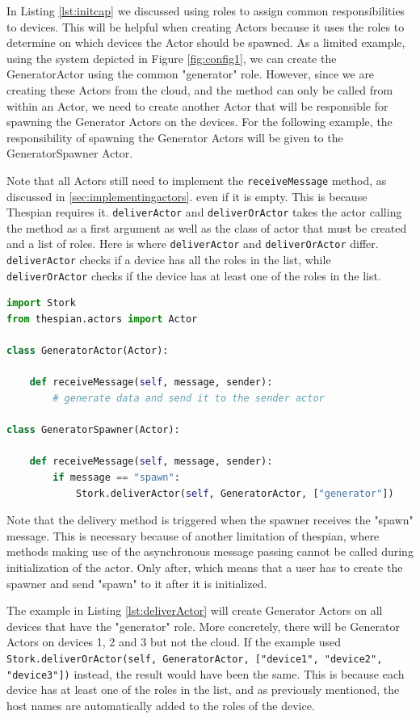 \documentclass[a4paper]{article}
\newcommand{\secref}[1]{\autoref{#1}.}
\begin{document}
In Listing \ref{lst:initcap} we discussed using roles to assign common responsibilities to devices. This will be helpful when creating Actors because it uses the roles to determine on which devices the Actor should be spawned. As a limited example, using the system depicted in Figure \ref{fig:config1}, we can create the GeneratorActor using the common "generator" role. However, since we are creating these Actors from the cloud, and the method can only be called from within an Actor, we need to create another Actor that will be responsible for spawning the Generator Actors on the devices. For the following example, the responsibility of spawning the Generator Actors will be given to the GeneratorSpawner Actor.

Note that all Actors still need to implement the \lstinline{receiveMessage} method, as discussed in \secref{sec:implementingactors} even if it is empty. This is because Thespian requires it. \lstinline|deliverActor| and \lstinline|deliverOrActor| takes the actor calling the method as a first argument as well as the class of actor that must be created and a list of roles. Here is where \lstinline|deliverActor| and \lstinline|deliverOrActor| differ. \lstinline|deliverActor| checks if a device has all the roles in the list, while \lstinline|deliverOrActor| checks if the device has at least one of the roles in the list.
\begin{lstlisting}[language=Python, caption=Delivering Actors, label=lst:deliverActor]
import Stork
from thespian.actors import Actor

class GeneratorActor(Actor):

    def receiveMessage(self, message, sender):
        # generate data and send it to the sender actor

class GeneratorSpawner(Actor):

    def receiveMessage(self, message, sender):
        if message == "spawn":
            Stork.deliverActor(self, GeneratorActor, ["generator"])

\end{lstlisting}
Note that the delivery method is triggered when the spawner receives the "spawn" message. This is necessary because of another limitation of thespian, where methods making use of the asynchronous message passing cannot be called during initialization of the actor. Only after, which means that a user has to create the spawner and send "spawn" to it after it is initialized.

The example in Listing \ref{lst:deliverActor} will create Generator Actors on all devices that have the "generator" role. More concretely, there will be Generator Actors on devices 1, 2 and 3 but not the cloud. If the example used \lstinline|Stork.deliverOrActor(self, GeneratorActor, ["device1", "device2", "device3"])| instead, the result would have been the same. This is because each device has at least one of the roles in the list, and as previously mentioned, the host names are automatically added to the roles of the device.
\end{document}
